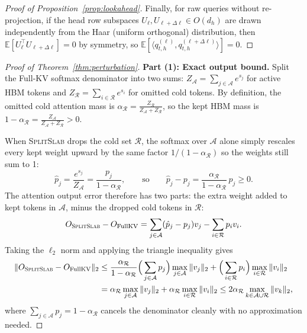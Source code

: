 \documentclass[pdflatex,sn-mathphys-num]{sn-jnl}
\theoremstyle{thmstyleone}
\newcommand{\SplitSlab}{\textsc{SplitSlab}}
\newcommand{\E}{\mathbb{E}}
\begin{document}
\begin{appendices}
\begin{proof}[Proof of Proposition~\ref{prop:lookahead}]
Finally, for raw queries without re-projection, if the head row subspaces $U_\ell, U_{\ell+\Delta\ell} \in O(d_h)$ are drawn independently from the Haar (uniform orthogonal) distribution, then $\E[U_\ell^\top U_{\ell+\Delta\ell}] = 0$ by symmetry, so $\E[\langle q_{t,h}^{(\ell)}, q_{t,h}^{(\ell+\Delta\ell)} \rangle] = 0$.
\end{proof}

\begin{proof}[Proof of Theorem~\ref{thm:perturbation}]
\textbf{Part (1): Exact output bound.}
Split the Full-KV softmax denominator into two sums: $Z_{\mathcal{A}} = \sum_{j \in \mathcal{A}} e^{s_j}$ for active HBM tokens and $Z_{\mathcal{R}} = \sum_{i \in \mathcal{R}} e^{s_i}$ for omitted cold tokens. By definition, the omitted cold attention mass is $\alpha_{\mathcal{R}} = \frac{Z_{\mathcal{R}}}{Z_{\mathcal{A}} + Z_{\mathcal{R}}}$, so the kept HBM mass is $1 - \alpha_{\mathcal{R}} = \frac{Z_{\mathcal{A}}}{Z_{\mathcal{A}} + Z_{\mathcal{R}}} > 0$.

When \SplitSlab{} drops the cold set $\mathcal{R}$, the softmax over $\mathcal{A}$ alone simply rescales every kept weight upward by the same factor $1/(1 - \alpha_{\mathcal{R}})$ so the weights still sum to 1:
\[
\hat{p}_j = \frac{e^{s_j}}{Z_{\mathcal{A}}} = \frac{p_j}{1 - \alpha_{\mathcal{R}}},
\qquad\text{so}\qquad
\hat{p}_j - p_j = \frac{\alpha_{\mathcal{R}}}{1 - \alpha_{\mathcal{R}}}\, p_j \ge 0.
\]
The attention output error therefore has two parts: the extra weight added to kept tokens in $\mathcal{A}$, minus the dropped cold tokens in $\mathcal{R}$:
\[
O_{\SplitSlab} - O_{\mathrm{FullKV}}
= \sum_{j \in \mathcal{A}} (\hat{p}_j - p_j) v_j - \sum_{i \in \mathcal{R}} p_i v_i.
\]
Taking the $\ell_2$ norm and applying the triangle inequality gives
\begin{align*}
\|O_{\SplitSlab} - O_{\mathrm{FullKV}}\|_2
&\le \frac{\alpha_{\mathcal{R}}}{1 - \alpha_{\mathcal{R}}} \Big(\sum_{j \in \mathcal{A}} p_j\Big) \max_{j \in \mathcal{A}} \|v_j\|_2
   + \Big(\sum_{i \in \mathcal{R}} p_i\Big) \max_{i \in \mathcal{R}} \|v_i\|_2 \\
&= \alpha_{\mathcal{R}} \max_{j \in \mathcal{A}} \|v_j\|_2 + \alpha_{\mathcal{R}} \max_{i \in \mathcal{R}} \|v_i\|_2
\le 2 \alpha_{\mathcal{R}} \max_{k \in \mathcal{A} \cup \mathcal{R}} \|v_k\|_2,
\end{align*}
where $\sum_{j \in \mathcal{A}} p_j = 1 - \alpha_{\mathcal{R}}$ cancels the denominator cleanly with no approximation needed.


\end{proof}
\end{appendices}
\end{document}
